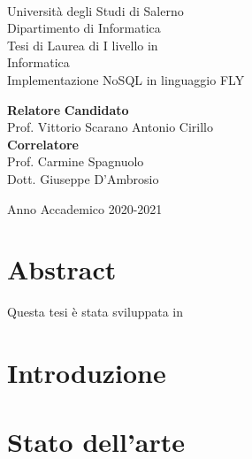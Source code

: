 \documentclass[11pt,oneside]{book}
\begin{document}

\begin{titlepage}
\begin{center}
\\[0.2truecm]
{\Large Universit\`a degli Studi di Salerno}\\[0.2truecm]
{\large Dipartimento di Informatica}\\
\hrulefill
\vfill
{\large Tesi di Laurea di I livello in }\\[0.2truecm]
{\Large Informatica}\\
\vfill\vfill
{\Huge Implementazione NoSQL in linguaggio FLY}
\vfill\vfill


{\bf Relatore} \hfill {\bf Candidato}\ \ \\
Prof. Vittorio Scarano \hfill Antonio Cirillo\\
{\bf Correlatore} \hfill \ \ \\
Prof. Carmine Spagnuolo \hfill \ \ \\
Dott. Giuseppe D'Ambrosio \hfill \ \ \\

\vfill
\hrulefill 

Anno Accademico 2020-2021

\end{center}
\end{titlepage}

\chapter*{Abstract}


\vfill
\centerline{\Large\sf Questa tesi è stata sviluppata in  }

\tableofcontents
\pagestyle{plain}

\chapter{Introduzione}
\setcounter{page}{1} 	%


\chapter{Stato dell'arte}

\end{document}
